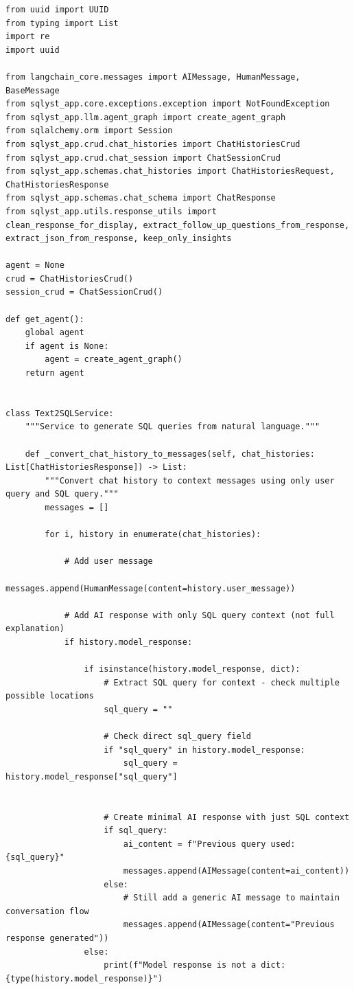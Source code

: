 \begin{lstlisting}[style=python, numbers=none, caption={Text2SQL chat service (\code{text2sql\_service.py})}, label={lst:text2sql-service}]
from uuid import UUID
from typing import List
import re
import uuid

from langchain_core.messages import AIMessage, HumanMessage, BaseMessage
from sqlyst_app.core.exceptions.exception import NotFoundException
from sqlyst_app.llm.agent_graph import create_agent_graph
from sqlalchemy.orm import Session
from sqlyst_app.crud.chat_histories import ChatHistoriesCrud
from sqlyst_app.crud.chat_session import ChatSessionCrud
from sqlyst_app.schemas.chat_histories import ChatHistoriesRequest, ChatHistoriesResponse
from sqlyst_app.schemas.chat_schema import ChatResponse
from sqlyst_app.utils.response_utils import clean_response_for_display, extract_follow_up_questions_from_response, extract_json_from_response, keep_only_insights

agent = None
crud = ChatHistoriesCrud()
session_crud = ChatSessionCrud()

def get_agent():
    global agent
    if agent is None:
        agent = create_agent_graph()
    return agent


class Text2SQLService:
    """Service to generate SQL queries from natural language."""

    def _convert_chat_history_to_messages(self, chat_histories: List[ChatHistoriesResponse]) -> List:
        """Convert chat history to context messages using only user query and SQL query."""
        messages = []

        for i, history in enumerate(chat_histories):

            # Add user message
            messages.append(HumanMessage(content=history.user_message))

            # Add AI response with only SQL query context (not full explanation)
            if history.model_response:

                if isinstance(history.model_response, dict):
                    # Extract SQL query for context - check multiple possible locations
                    sql_query = ""

                    # Check direct sql_query field
                    if "sql_query" in history.model_response:
                        sql_query = history.model_response["sql_query"]


                    # Create minimal AI response with just SQL context
                    if sql_query:
                        ai_content = f"Previous query used: {sql_query}"
                        messages.append(AIMessage(content=ai_content))
                    else:
                        # Still add a generic AI message to maintain conversation flow
                        messages.append(AIMessage(content="Previous response generated"))
                else:
                    print(f"Model response is not a dict: {type(history.model_response)}")


\end{lstlisting}
